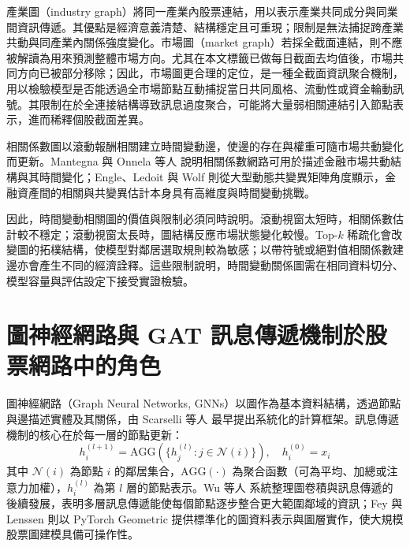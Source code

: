 產業圖（industry graph）將同一產業內股票連結，用以表示產業共同成分與同業間資訊傳遞。其優點是經濟意義清楚、結構穩定且可重現；限制是無法捕捉跨產業共動與同產業內關係強度變化。市場圖（market graph）若採全截面連結，則不應被解讀為用來預測整體市場方向。尤其在本文標籤已做每日截面去均值後，市場共同方向已被部分移除；因此，市場圖更合理的定位，是一種全截面資訊聚合機制，用以檢驗模型是否能透過全市場節點互動捕捉當日共同風格、流動性或資金輪動訊號。其限制在於全連接結構導致訊息過度聚合，可能將大量弱相關連結引入節點表示，進而稀釋個股截面差異。

相關係數圖以滾動報酬相關建立時間變動邊，使邊的存在與權重可隨市場共動變化而更新。Mantegna \cite{mantegna1999hierarchical} 與 Onnela 等人 \cite{onnela2003dynamics} 說明相關係數網路可用於描述金融市場共動結構與其時間變化；Engle、Ledoit 與 Wolf \cite{engle2019large_dynamic_covariance} 則從大型動態共變異矩陣角度顯示，金融資產間的相關與共變異估計本身具有高維度與時間變動挑戰。

因此，時間變動相關圖的價值與限制必須同時說明。滾動視窗太短時，相關係數估計較不穩定；滾動視窗太長時，圖結構反應市場狀態變化較慢。Top-$k$ 稀疏化會改變圖的拓樸結構，使模型對鄰居選取規則較為敏感；以帶符號或絕對值相關係數建邊亦會產生不同的經濟詮釋。這些限制說明，時間變動關係圖需在相同資料切分、模型容量與評估設定下接受實證檢驗。

\section{圖神經網路與 GAT 訊息傳遞機制於股票網路中的角色}
\label{sec:gnn_gat_message_passing_stock_network}

圖神經網路（Graph Neural Networks, GNNs）以圖作為基本資料結構，透過節點與邊描述實體及其關係，由 Scarselli 等人 \cite{scarselli2009gnn} 最早提出系統化的計算框架。訊息傳遞機制的核心在於每一層的節點更新：
\begin{equation}
h_i^{(l+1)} = \mathrm{AGG}\!\left(\bigl\{h_j^{(l)} : j \in \mathcal{N}(i)\bigr\}\right), \quad h_i^{(0)} = x_i
\label{eq:gnn_message_passing}
\end{equation}
其中 \(\mathcal{N}(i)\) 為節點 \(i\) 的鄰居集合，\(\mathrm{AGG}(\cdot)\) 為聚合函數（可為平均、加總或注意力加權），\(h_i^{(l)}\) 為第 \(l\) 層的節點表示。Wu 等人 \cite{wu2020comprehensive} 系統整理圖卷積與訊息傳遞的後續發展，表明多層訊息傳遞能使每個節點逐步整合更大範圍鄰域的資訊；Fey 與 Lenssen \cite{fey2019pyg} 則以 PyTorch Geometric 提供標準化的圖資料表示與圖層實作，使大規模股票圖建模具備可操作性。

